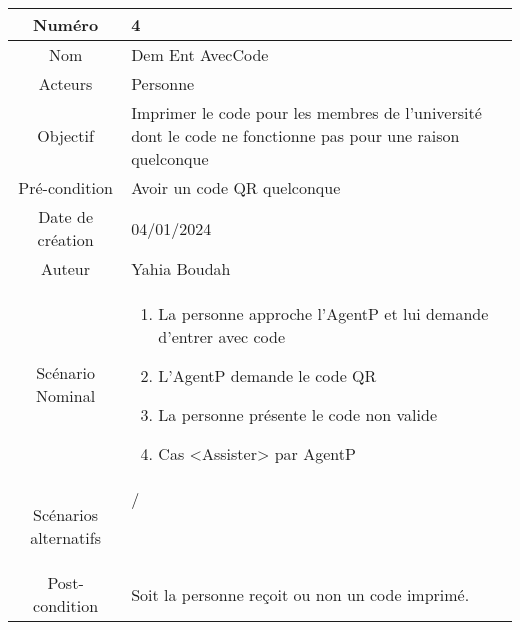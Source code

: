 

\begin{tabular}{ |c|p{12cm}| }
    \hline
    Numéro & 4 \\
    \hline
    Nom & Dem Ent AvecCode \\
    \hline
    Acteurs & Personne \\ 
    \hline
    Objectif & Imprimer le code pour les membres de l'université dont le code ne fonctionne pas pour une raison quelconque \\ 
    \hline
    Pré-condition & Avoir un code QR quelconque\\
    \hline
    Date de création & 04/01/2024 \\
    \hline
    Auteur & Yahia Boudah \\
    \hline
    Scénario Nominal & \begin{enumerate}
        \item La personne approche l'AgentP et lui demande d'entrer avec code
        \item L'AgentP demande le code QR
        \item La personne présente le code non valide
        \item Cas <Assister> par AgentP
    \end{enumerate} \\
    \hline
    Scénarios alternatifs & \begin{description}
        \item[/]
    \end{description} \\
    \hline
    Post-condition & Soit la personne reçoit ou non un code imprimé. \\
    \hline
\end{tabular}